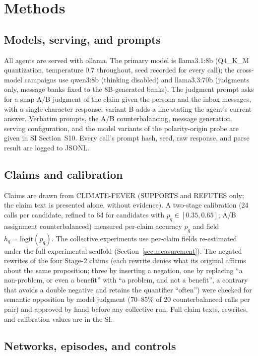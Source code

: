 \documentclass[11pt]{article}
\begin{document}
\section*{Methods}

\subsection*{Models, serving, and prompts}

All agents are served with ollama. The primary model is llama3.1:8b
(Q4\_K\_M quantization, temperature 0.7 throughout, seed recorded for every
call); the cross-model campaigns use qwen3:8b (thinking disabled) and
llama3.3:70b (judgments only, message banks fixed to the 8B-generated banks).
The judgment prompt asks for a snap A/B judgment of the claim given the
persona and the inbox messages, with a single-character response; variant B
adds a line stating the agent's current answer. Verbatim prompts, the A/B
counterbalancing, message generation, serving configuration, and the model
variants of the polarity-origin probe are given in SI Section~S10. Every
call's prompt hash, seed, raw response, and parse result are logged to JSONL.

\subsection*{Claims and calibration}

Claims are drawn from CLIMATE-FEVER \citep{Diggelmann2020} (SUPPORTS and
REFUTES only; the claim text is presented alone, without evidence). A
two-stage calibration (24 calls per candidate, refined to 64 for candidates
with $p_q \in [0.35, 0.65]$; A/B assignment counterbalanced) measured
per-claim accuracy $p_q$ and field $h_q = \mathrm{logit}(p_q)$. The collective
experiments use per-claim fields re-estimated under the full experimental
scaffold (Section~\ref{sec:measurement}). The negated rewrites of the four
Stage-2 claims (each rewrite denies what its original affirms about the
same proposition; three by inserting a negation, one by replacing ``a non-problem, or even a
benefit'' with ``a problem, and not a benefit'', a contrary that avoids a
double negative and retains the quantifier ``often'') were checked for
semantic opposition by model judgment
(70--85\% of 20 counterbalanced calls per pair) and approved by hand before
any collective run. Full claim texts, rewrites, and calibration values are in
the SI.

\subsection*{Networks, episodes, and controls}
\end{document}
